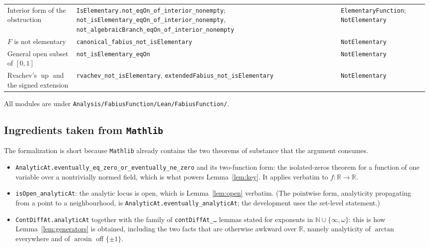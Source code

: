 \documentclass[11pt,oneside]{article}
\theoremstyle{definition}
\theoremstyle{remark}
\newcommand{\R}{\mathbb R}
\newcommand{\N}{\mathbb N}
\newcommand{\Up}{\operatorname{up}}
\newcommand{\repo}{\nolinkurl{Analysis/FabiusFunction}}
\begin{document}
\begin{center}
\begin{tabular}{@{}p{}p{}p{}@{}}
Interior form of the obstruction
  & \texttt{IsElementary.not\_eqOn\_of\_interior\_nonempty}; \texttt{not\_isElementary\_eqOn\_of\_interior\_nonempty}, \texttt{not\_algebraicBranch\_eqOn\_of\_interior\_nonempty}
  & \texttt{ElementaryFunction}; \texttt{NotElementary} \\
$F$ is not elementary
  & \texttt{canonical\_fabius\_not\_isElementary}
  & \texttt{NotElementary} \\
General open subset of $[0,1]$
  & \texttt{not\_isElementary\_eqOn}
  & \texttt{NotElementary} \\
Rvachev's $\Up$ and the signed extension
  & \texttt{rvachev\_not\_isElementary}, \texttt{extendedFabius\_not\_isElementary}
  & \texttt{NotElementary} \\
\bottomrule
\end{tabular}
\end{center}

All modules are under \texttt{\repo/Lean/FabiusFunction/}.

\subsection{Ingredients taken from \texttt{Mathlib}}

The formalization is short because \texttt{Mathlib} already contains the two
theorems of substance that the argument consumes.

\begin{itemize}
\item \texttt{AnalyticAt.eventually\_eq\_zero\_or\_eventually\_ne\_zero} and
      its two-function form: the isolated-zeros theorem for a function of one
      variable over a nontrivially normed field, which is what powers
      Lemma~\ref{lem:key}.  It applies verbatim to $f\colon\R\to\R$.
\item \texttt{isOpen\_analyticAt}: the analytic locus is open, which is
      Lemma~\ref{lem:open} verbatim.  (The pointwise form, analyticity propagating
      from a point to a neighbourhood, is
      \texttt{AnalyticAt.eventually\_analyticAt}; the development uses the
      set-level statement.)
\item \texttt{ContDiffAt.analyticAt} together with the family of
      \texttt{contDiffAt\_\ldots} lemmas stated for exponents in
      $\N\cup\{\infty,\omega\}$: this is how Lemma~\ref{lem:generators} is
      obtained, including the two facts that are otherwise awkward over $\R$,
      namely analyticity of $\arctan$ everywhere and of $\arcsin$ off
      $\{\pm1\}$.
\end{itemize}
\end{document}
